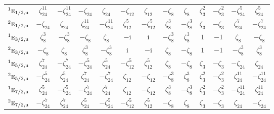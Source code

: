\documentclass[10pt,a4paper]{article}
\numberwithin{equation}{section}
\newcommand{\irr}[1]{\text{\normalfont\scshape #1}}
\newcommand{\conjpair}[1]{{}^{#1}}
\newcommand{\ptag}[1]{\mathrm{#1}}
\newcommand{\iunit}{\mathrm{i}}
\newcommand{\rootunity}[1]{\zeta_{#1}}
\begin{document}
{\begin{longtable}{@{}lcccccccccccc@{}}
$\conjpair{1}\irr{e}_{1/2,\ptag{u}}$ & $\rootunity{24}^{11}$ & $-\rootunity{24}^{11}$ & $-\rootunity{24}$ & $\rootunity{24}$ & $-\rootunity{12}$ & $\rootunity{12}$ & $-\rootunity{8}$ & $\rootunity{8}$ & $\rootunity{3}^{2}$ & $-\rootunity{3}^{2}$ & $-\rootunity{24}^{5}$ & $\rootunity{24}^{5}$\\
$\conjpair{2}\irr{e}_{1/2,\ptag{u}}$ & $-\rootunity{24}$ & $\rootunity{24}$ & $\rootunity{24}^{11}$ & $-\rootunity{24}^{11}$ & $\rootunity{12}^{5}$ & $-\rootunity{12}^{5}$ & $\rootunity{8}^{3}$ & $-\rootunity{8}^{3}$ & $\rootunity{3}$ & $-\rootunity{3}$ & $\rootunity{24}^{7}$ & $-\rootunity{24}^{7}$\\
$\conjpair{1}\irr{e}_{3/2,\ptag{u}}$ & $\rootunity{8}^{3}$ & $-\rootunity{8}^{3}$ & $-\rootunity{8}$ & $\rootunity{8}$ & $-\iunit{}$ & $\iunit{}$ & $-\rootunity{8}^{3}$ & $\rootunity{8}^{3}$ & $1$ & $-1$ & $\rootunity{8}$ & $-\rootunity{8}$\\
$\conjpair{2}\irr{e}_{3/2,\ptag{u}}$ & $-\rootunity{8}$ & $\rootunity{8}$ & $\rootunity{8}^{3}$ & $-\rootunity{8}^{3}$ & $\iunit{}$ & $-\iunit{}$ & $\rootunity{8}$ & $-\rootunity{8}$ & $1$ & $-1$ & $-\rootunity{8}^{3}$ & $\rootunity{8}^{3}$\\
$\conjpair{1}\irr{e}_{5/2,\ptag{u}}$ & $\rootunity{24}^{7}$ & $-\rootunity{24}^{7}$ & $-\rootunity{24}^{5}$ & $\rootunity{24}^{5}$ & $-\rootunity{12}^{5}$ & $\rootunity{12}^{5}$ & $\rootunity{8}$ & $-\rootunity{8}$ & $\rootunity{3}$ & $-\rootunity{3}$ & $-\rootunity{24}$ & $\rootunity{24}$\\
$\conjpair{2}\irr{e}_{5/2,\ptag{u}}$ & $-\rootunity{24}^{5}$ & $\rootunity{24}^{5}$ & $\rootunity{24}^{7}$ & $-\rootunity{24}^{7}$ & $\rootunity{12}$ & $-\rootunity{12}$ & $-\rootunity{8}^{3}$ & $\rootunity{8}^{3}$ & $\rootunity{3}^{2}$ & $-\rootunity{3}^{2}$ & $\rootunity{24}^{11}$ & $-\rootunity{24}^{11}$\\
$\conjpair{1}\irr{e}_{7/2,\ptag{u}}$ & $\rootunity{24}^{5}$ & $-\rootunity{24}^{5}$ & $-\rootunity{24}^{7}$ & $\rootunity{24}^{7}$ & $\rootunity{12}$ & $-\rootunity{12}$ & $\rootunity{8}^{3}$ & $-\rootunity{8}^{3}$ & $\rootunity{3}^{2}$ & $-\rootunity{3}^{2}$ & $-\rootunity{24}^{11}$ & $\rootunity{24}^{11}$\\
$\conjpair{2}\irr{e}_{7/2,\ptag{u}}$ & $-\rootunity{24}^{7}$ & $\rootunity{24}^{7}$ & $\rootunity{24}^{5}$ & $-\rootunity{24}^{5}$ & $-\rootunity{12}^{5}$ & $\rootunity{12}^{5}$ & $-\rootunity{8}$ & $\rootunity{8}$ & $\rootunity{3}$ & $-\rootunity{3}$ & $\rootunity{24}$ & $-\rootunity{24}$\\

\end{longtable}}
\end{document}
